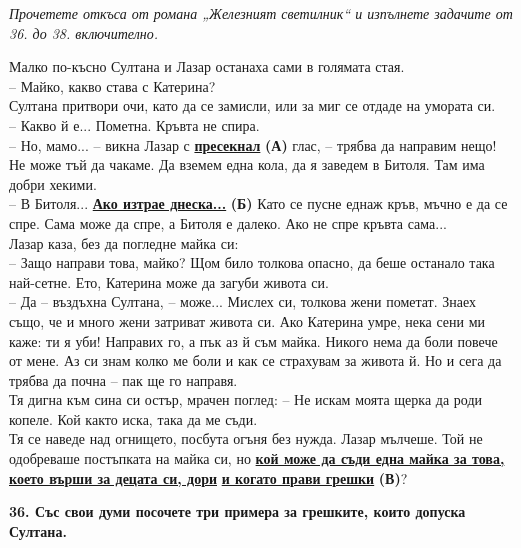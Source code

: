 \documentclass[12pt,a4paper]{article}
\begin{document}
\vspace{0.8cm}

\textit{Прочетете откъса от романа „Железният светилник“ и изпълнете задачите от 36. до 38. включително.}

\vspace{0.4cm}

\noindent
Малко по-късно Султана и Лазар останаха сами в голямата стая. \\
– Майко, какво става с Катерина? \\
Султана притвори очи, като да се замисли, или за миг се отдаде на умората си. \\
– Какво й е... Пометна. Кръвта не спира. \\
– Но, мамо... – викна Лазар с \underline{\textbf{пресекнал}} \textbf{(А)} глас, – трябва да направим нещо! Не може тъй да чакаме. Да вземем една кола, да я заведем в Битоля. Там има добри хекими. \\
– В Битоля... \underline{\textbf{Ако изтрае днеска...}} \textbf{(Б)} Като се пусне еднаж кръв, мъчно е да се спре. Сама може да спре, а Битоля е далеко. Ако не спре кръвта сама... \\
Лазар каза, без да погледне майка си: \\
– Защо направи това, майко? Щом било толкова опасно, да беше останало така най-сетне. Ето, Катерина може да загуби живота си. \\
– Да – въздъхна Султана, – може... Мислех си, толкова жени пометат. Знаех също, че и много жени затриват живота си. Ако Катерина умре, нека сени ми каже: ти я уби! Направих го, а пък аз й съм майка. Никого нема да боли повече от мене. Аз си знам колко ме боли и как се страхувам за живота й. Но и сега да трябва да почна – пак ще го направя. \\
Тя дигна към сина си остър, мрачен поглед: – Не искам моята щерка да роди копеле. Кой както иска, така да ме съди. \\
Тя се наведе над огнището, посбута огъня без нужда. Лазар мълчеше. Той не одобреваше постъпката на майка си, но \underline{\textbf{кой може да съди една майка за това, което върши за децата си, дори}} \underline{\textbf{и когато прави грешки}} \textbf{(В)}?

\vspace{0.8cm}

\noindent
\textbf{36. Със свои думи посочете три примера за грешките, които допуска Султана.} \\
\noindent
\makebox[\textwidth]{\dotfill} \\
\makebox[\textwidth]{\dotfill} \\
\makebox[\textwidth]{\dotfill} \\
\makebox[\textwidth]{\dotfill}
\end{document}

